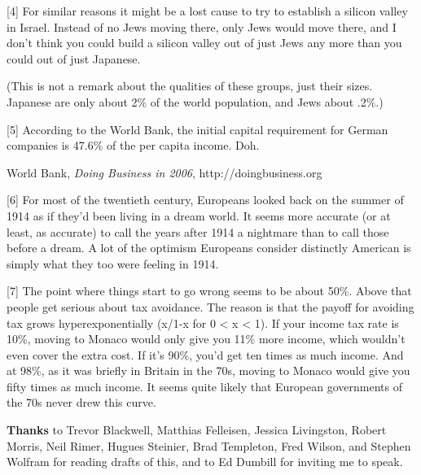 [4] For similar reasons it might be a lost cause to try to
                  establish a silicon valley in Israel. Instead of no Jews
                  moving there, only Jews would move there, and I don't think
                  you could build a silicon valley out of just Jews any more
                  than you could out of just Japanese.

(This is not a
                  remark about the qualities of these groups, just their sizes.
                  Japanese are only about 2\% of the world population, and Jews
                  about .2\%.)

[5] According to the World Bank, the initial capital
                  requirement for German companies is 47.6\% of the per capita
                  income. Doh.

World Bank,
                  \emph{Doing Business in 2006}, http://doingbusiness.org

[6] For most of the twentieth century, Europeans looked back on
                  the summer of 1914 as if they'd been living in a dream world.
                  It seems more accurate (or at least, as accurate) to call the
                  years after 1914 a nightmare than to call those before a
                  dream. A lot of the optimism Europeans consider distinctly
                  American is simply what they too were feeling in 1914.

[7] The point where things start to go wrong seems to be about
                  50\%. Above that people get serious about tax avoidance. The
                  reason is that the payoff for avoiding tax grows
                  hyperexponentially (x/1-x for 0 < x < 1). If your income tax
                  rate is 10\%, moving to Monaco would only give you 11\% more
                  income, which wouldn't even cover the extra cost. If it's 90\%,
                  you'd get ten times as much income. And at 98\%, as it was
                  briefly in Britain in the 70s, moving to Monaco would give you
                  fifty times as much income. It seems quite likely that
                  European governments of the 70s never drew this curve.

\textbf{Thanks}
                  to Trevor Blackwell, Matthias Felleisen, Jessica Livingston,
                  Robert Morris, Neil Rimer, Hugues Steinier, Brad Templeton,
                  Fred Wilson, and Stephen Wolfram for reading drafts of this,
                  and to Ed Dumbill for inviting me to speak.


              
            
          
